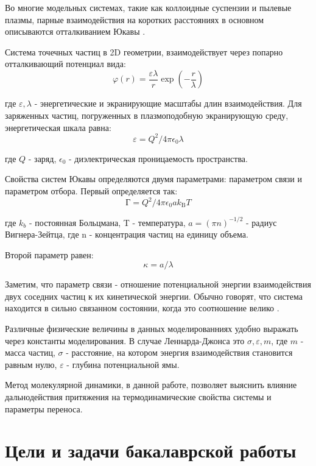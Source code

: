 Во многие модельных системах, такие как коллоидные суспензии и пылевые плазмы, парные взаимодействия на коротких расстояниях в основном описываются отталкиванием Юкавы \cite{phase59}.

Система точечных частиц в 2D геометрии, взаимодействует через попарно отталкивающий потенциал вида:
\begin{equation}
\varphi(r)=\frac{\varepsilon \lambda}{r} \exp \left(-\frac{r}{\lambda}\right)
\end{equation}

где $\varepsilon, \lambda$ - энергетические и экранирующие масштабы длин взаимодействия. Для заряженных частиц, погруженных в плазмоподобную экранирующую среду, энергетическая шкала равна:
\begin{equation}
\varepsilon=Q^{2} / 4 \pi \epsilon_{0} \lambda
\end{equation}

где $Q$ - заряд, $\epsilon_{0}$ - диэлектрическая проницаемость пространства.

Свойства систем Юкавы определяются двумя параметрами: параметром связи и параметром отбора. Первый определяется так:
\begin{equation}
\text{Г}=Q^{2} / 4 \pi \epsilon_{0} a k_{\mathrm{B}} T
\end{equation}

где $k_b$ - постоянная Больцмана, T - температура, $a=(\pi n)^{-1 / 2}$ - радиус Вигнера-Зейтца, где n - концентрация частиц на единицу объема.

Второй параметр равен:
\begin{equation}\kappa=a / \lambda\end{equation}

Заметим, что параметр связи - отношение потенциальной энергии взаимодействия двух соседних частиц к их кинетической энергии. Обычно говорят, что система находится в сильно связанном состоянии, когда это соотношение велико \cite{phase59}.

Различные физические величины в данных моделированниях удобно выражать через константы моделирования. В случае Леннарда-Джонса это  $\sigma, \varepsilon, m$, где $m$ - масса частиц, $\sigma$ - расстояние, на котором энергия взаимодействия становится равным нулю, $\varepsilon$ - глубина потенциальной ямы.

Метод молекулярной динамики, в данной работе, позволяет выяснить влияние дальнодействия притяжения на термодинамические свойства системы и параметры переноса.

\section{Цели и задачи бакалаврской работы}

